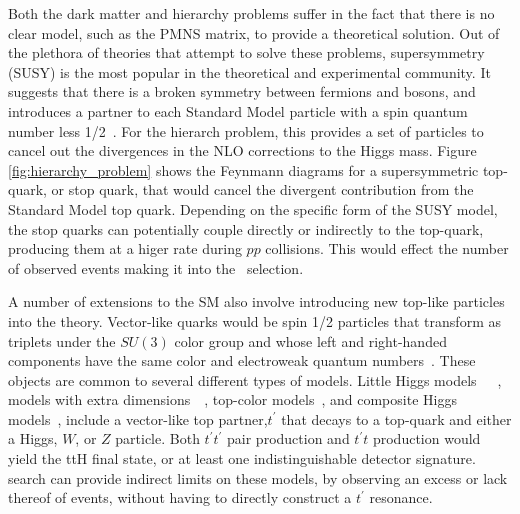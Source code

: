 \par Both the dark matter and hierarchy problems suffer in the fact
that there is no clear model, such as the PMNS matrix, to provide a
theoretical solution.  Out of the plethora of theories that attempt to
solve these problems, supersymmetry (SUSY) is the most popular in the
theoretical and experimental community.  It suggests that there is a
broken symmetry between fermions and bosons, and introduces a partner
to each Standard Model particle with a spin quantum number less
1/2~\cite{Martin_SUSY_primer}.  For the hierarch problem, this
provides a set of particles to cancel out the divergences in the NLO
corrections to the Higgs mass.  Figure \ref{fig:hierarchy_problem}
shows the Feynmann diagrams for a supersymmetric top-quark, or stop
quark, that would cancel the divergent contribution from the Standard
Model top quark.  Depending on the specific form of the SUSY model,
the stop quarks can potentially couple directly or indirectly to the
top-quark, producing them at a higer rate during $pp$ collisions.
This would effect the number of observed events making it into the
\ttH~selection.  

\par A number of extensions to the SM also involve introducing new
top-like particles into the theory.  Vector-like quarks would be spin
1/2 particles that transform as triplets under the $SU(3)$ color group
and whose left and right-handed components have the same  
color and electroweak quantum
numbers~\cite{VectorLikeQuarks_Aguilar-Saavedra}.  These objects are
common to several different types of models.  Little Higgs
models~\cite{BSM_littleHiggs_Burdman}~\cite{BSM_littleHiggs_Perelstein}~\cite{BSM_littleHiggs_PhysRevD.74.055001}, 
models with extra
dimensions~\cite{BSM_extraD_Cheng:1999bg}~\cite{BSM_extraD_Carena:2006bn},
top-color models~\cite{BSM_topColor_Hill:1991at}, and composite Higgs
models~\cite{BSM_composite_Higgs_Contino:2006qr}, include a
vector-like top partner,$ t^{\prime}$ that decays to a top-quark and
either a Higgs, $W$, or $Z$ particle.  Both $t^{\prime}t^{\prime}$
pair production and $t^{\prime}t$ production would yield the ttH final
state, or at least one indistinguishable detector signature.  \ttH
search can provide indirect limits on these models, by observing an
excess or lack thereof of \ttH events, without having to directly
construct a $t^{\prime}$ resonance.  


      
